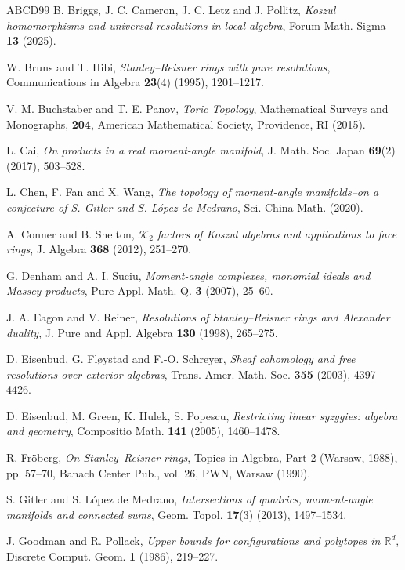 \documentclass[a4paper,10pt]{amsart}
\theoremstyle{definition}
\theoremstyle{remark}
\begin{document}
\begin{thebibliography}{ABCD99}
 B. Briggs, J. C. Cameron, J. C. Letz and J. Pollitz, \emph{Koszul homomorphisms and universal resolutions in local algebra}, Forum Math. Sigma \textbf{13} (2025).

 W. Bruns and T. Hibi, \emph{Stanley--Reisner rings with pure resolutions}, Communications in Algebra \textbf{23}(4) (1995), 1201--1217.

 V. M. Buchstaber and T. E. Panov, \emph{Toric Topology}, Mathematical Surveys and Monographs, \textbf{204}, American Mathematical Society, Providence, RI (2015).

 L. Cai, \emph{On products in a real moment-angle manifold}, J. Math. Soc. Japan \textbf{69}(2) (2017), 503--528.

 L. Chen, F. Fan and X. Wang, \emph{The topology of moment-angle manifolds--on a conjecture of S. Gitler and S. L\'opez de Medrano}, Sci. China Math. (2020).

 A. Conner and B. Shelton, \emph{$\mathcal{K}_2$ factors of Koszul algebras and applications to face rings}, J. Algebra \textbf{368} (2012), 251--270.

 G. Denham and A. I. Suciu, \emph{Moment-angle complexes, monomial ideals and Massey products}, Pure Appl. Math. Q. \textbf{3} (2007), 25--60.

 J. A. Eagon and V. Reiner, \emph{Resolutions of Stanley--Reisner rings and Alexander duality}, J. Pure and Appl. Algebra \textbf{130} (1998), 265--275.

 D. Eisenbud, G. Fl\o ystad and F.-O. Schreyer, \emph{Sheaf cohomology and free resolutions over exterior algebras}, Trans. Amer. Math. Soc. \textbf{355} (2003), 4397--4426.

 D. Eisenbud, M. Green, K. Hulek, S. Popescu, \emph{Restricting linear syzygies: algebra and geometry}, Compositio Math. \textbf{141} (2005), 1460--1478.

 R. Fr\"oberg, \emph{On Stanley--Reisner rings}, Topics in Algebra, Part 2 (Warsaw, 1988), pp. 57--70, Banach Center Pub., vol. 26, PWN, Warsaw (1990).

 S. Gitler and S. L\'opez de Medrano, \emph{Intersections of quadrics, moment-angle manifolds and connected sums}, Geom. Topol. \textbf{17}(3) (2013), 1497--1534.

 J. Goodman and R. Pollack, \emph{Upper bounds for configurations and polytopes in $\mathbb{R}^d$}, Discrete Comput. Geom. \textbf{1} (1986), 219--227.


\end{thebibliography}
\end{document}

